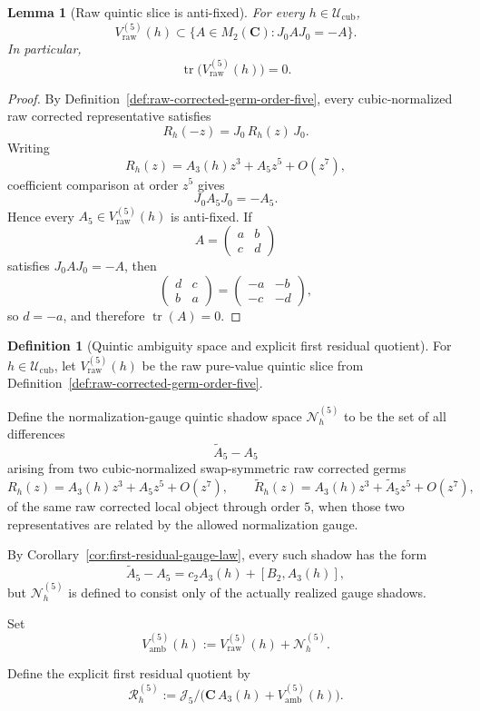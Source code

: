 \documentclass[11pt,a4paper]{amsart}
\theoremstyle{plain}
\newtheorem{lemma}[theorem]{Lemma}
\theoremstyle{definition}
\newtheorem{definition}[theorem]{Definition}
\begin{document}
\begin{lemma}[Raw quintic slice is anti-fixed]
\label{lem:raw-quintic-slice-antifixed}
For every $h\in\mathcal U_{\mathrm{cub}}$,
\[
V_{\mathrm{raw}}^{(5)}(h)\subset
\{A\in M_2(\mathbf C):J_0AJ_0=-A\}.
\]
In particular,
\[
\operatorname{tr}\bigl(V_{\mathrm{raw}}^{(5)}(h)\bigr)=0.
\]
\end{lemma}

\begin{proof}
By Definition~\ref{def:raw-corrected-germ-order-five}, every cubic-normalized
raw corrected representative satisfies
\[
R_h(-z)=J_0\,R_h(z)\,J_0.
\]
Writing
\[
R_h(z)=A_3(h)z^3+A_5 z^5+O(z^7),
\]
coefficient comparison at order $z^5$ gives
\[
J_0A_5J_0=-A_5.
\]
Hence every $A_5\in V_{\mathrm{raw}}^{(5)}(h)$ is anti-fixed. If
\[
A=
\begin{pmatrix}
a&b\\
c&d
\end{pmatrix}
\]
satisfies $J_0AJ_0=-A$, then
\[
\begin{pmatrix}
d&c\\
b&a
\end{pmatrix}
=
\begin{pmatrix}
-a&-b\\
-c&-d
\end{pmatrix},
\]
so $d=-a$, and therefore $\operatorname{tr}(A)=0$.
\end{proof}

\begin{definition}[Quintic ambiguity space and explicit first residual quotient]
\label{def:finite-order-quotient-model}
For $h\in \mathcal U_{\mathrm{cub}}$, let $V_{\mathrm{raw}}^{(5)}(h)$ be
the raw pure-value quintic slice from
Definition~\ref{def:raw-corrected-germ-order-five}.

Define the normalization-gauge quintic shadow space $\mathcal N_h^{(5)}$ to
be the set of all differences
\[
\widetilde A_5-A_5
\]
arising from two cubic-normalized swap-symmetric raw corrected germs
\[
R_h(z)=A_3(h)z^3+A_5 z^5+O(z^7),
\qquad
\widetilde R_h(z)=A_3(h)z^3+\widetilde A_5 z^5+O(z^7),
\]
of the same raw corrected local object through order $5$, when those two
representatives are related by the allowed normalization gauge.

By Corollary~\ref{cor:first-residual-gauge-law}, every such shadow has the
form
\[
\widetilde A_5-A_5=c_2A_3(h)+[B_2,A_3(h)],
\]
but $\mathcal N_h^{(5)}$ is defined to consist only of the actually realized
gauge shadows.

Set
\[
V_{\mathrm{amb}}^{(5)}(h)
:=
V_{\mathrm{raw}}^{(5)}(h)+\mathcal N_h^{(5)}.
\]

Define the explicit first residual quotient by
\[
\mathcal R_h^{(5)}
:=
\mathcal J_5/
\bigl(\mathbf C\,A_3(h)+V_{\mathrm{amb}}^{(5)}(h)\bigr).
\]
\end{definition}
\end{document}
